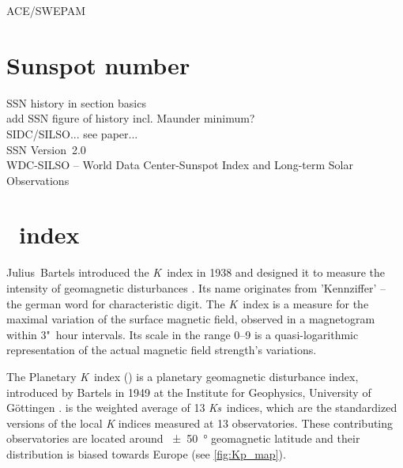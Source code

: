 ACE/SWEPAM\\	%


\section{Sunspot number}
\label{sec:sunspot_number}

SSN history in section basics\\
add SSN figure of history incl. Maunder minimum?\\
SIDC/SILSO... see paper...\\
SSN Version~2.0\\
WDC-SILSO -- World Data Center-Sunspot Index and Long-term Solar Observations\\


\section{\Kp{}~index}
\label{sec:kp_index}
Julius~Bartels introduced the \textit{K}~index in 1938 and designed it to measure the intensity of geomagnetic disturbances \citep{Bartels1939}. Its name originates from 'Kennziffer' -- the german word for characteristic digit. The \textit{K}~index is a measure for the maximal variation of the surface magnetic field, observed in a magnetogram within 3"~hour intervals. Its scale in the range 0--9 is a quasi-logarithmic representation of the actual magnetic field strength's variations.

The Planetary \textit{K}~index (\Kp{}) is a planetary geomagnetic disturbance index, introduced by Bartels in 1949 at the Institute for Geophysics, University of Göttingen \citep{Bartels1949}. \Kp{} is the weighted average of 13 \textit{Ks}~indices, which are the standardized versions of the local \textit{K} indices measured at 13 observatories. These contributing observatories are located around \SI{+-50}{\degree} geomagnetic latitude and their distribution is biased towards Europe (see \autoref{fig:Kp_map}).
\begin{figure}[htb]
\end{figure}

